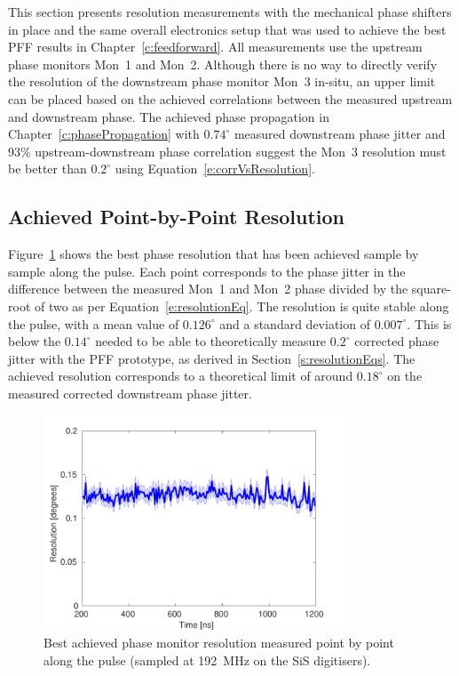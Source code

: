 
This section presents resolution measurements with the mechanical phase shifters in place and the same overall electronics setup that was used to achieve the best PFF results in Chapter~\ref{c:feedforward}. All measurements use the upstream phase monitors Mon~1 and Mon~2. Although there is no way to directly verify the resolution of the downstream phase monitor Mon~3 in-situ, an upper limit can be placed based on the achieved correlations between the measured upstream and downstream phase. The achieved phase propagation in Chapter~\ref{c:phasePropagation} with \(0.74^\circ\) measured downstream phase jitter and 93\% upstream-downstream phase correlation suggest the Mon~3 resolution must be better than \(0.2^\circ\) using Equation~\ref{e:corrVsResolution}.

\subsection{Achieved Point-by-Point Resolution}
\label{ss:bestRes}

Figure~\ref{f:bestResolution} shows the best phase resolution that has been achieved sample by sample along the pulse. Each point corresponds to the phase jitter in the difference between the measured Mon~1 and Mon~2 phase divided by the square-root of two as per Equation~\ref{e:resolutionEq}.  The resolution is quite stable along the pulse, with a mean value of \(0.126^\circ\) and a standard deviation of \(0.007^\circ\). This is below the \(0.14^\circ\) needed to be able to theoretically measure \(0.2^\circ\) corrected phase jitter with the PFF prototype, as derived in Section~\ref{s:resolutionEqs}. The achieved resolution corresponds to a theoretical limit of around \(0.18^\circ\) on the measured corrected downstream phase jitter. 

\begin{figure}
  \centering
  \includegraphics[width=0.8\textwidth]{Figures/phaseMons/bestResolution}
  \caption{Best achieved phase monitor resolution measured point by point along the pulse (sampled at 192~MHz on the SiS digitisers).}
  \label{f:bestResolution}
\end{figure}

